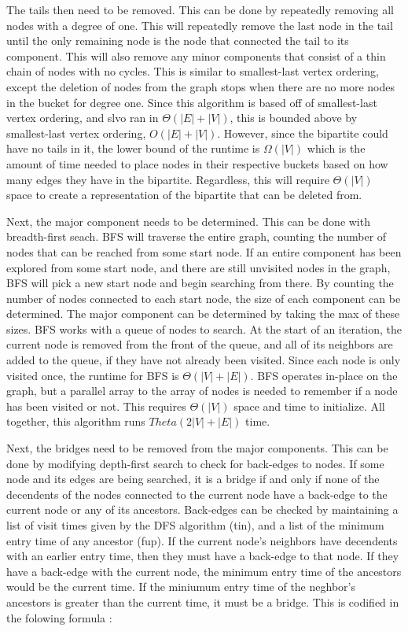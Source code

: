 \documentclass{article}
\begin{document}
        \par
        The tails then need to be removed. This can be done by repeatedly removing all nodes with a degree of one. This will repeatedly remove the last node in the tail until the only remaining node is the node that connected the tail to its component. This will also remove any minor components that consist of a thin chain of nodes with no cycles. This is similar to smallest-last vertex ordering, except the deletion of nodes from the graph stops when there are no more nodes in the bucket for degree one. Since this algorithm is based off of smallest-last vertex ordering, and slvo ran in $\Theta\left(|E| + |V|\right)$, this is bounded above by smallest-last vertex ordering, $O\left(|E| + |V|\right)$. However, since the bipartite could have no tails in it, the lower bound of the runtime is $\Omega(|V|)$ which is the amount of time needed to place nodes in their respective buckets based on how many edges they have in the bipartite. Regardless, this will require $\Theta(|V|)$ space to create a representation of the bipartite that can be deleted from.
        \par
        Next, the major component needs to be determined. This can be done with breadth-first seach. BFS will traverse the entire graph, counting the number of nodes that can be reached from some start node. If an entire component has been explored from some start node, and there are still unvisited nodes in the graph, BFS will pick a new start node and begin searching from there. By counting the number of nodes connected to each start node, the size of each component can be determined. The major component can be determined by taking the max of these sizes. BFS works with a queue of nodes to search. At the start of an iteration, the current node is removed from the front of the queue, and all of its neighbors are added to the queue, if they have not already been visited. Since each node is only visited once, the runtime for BFS is $\Theta(|V| + |E|)$. BFS operates in-place on the graph, but a parallel array to the array of nodes is needed to remember if a node has been visited or not. This requires $\Theta(|V|)$ space and time to initialize. All together, this algorithm runs $Theta(2|V| + |E|)$ time.
        \par
        Next, the bridges need to be removed from the major components. This can be done by modifying depth-first search to check for back-edges to nodes. If some node and its edges are being searched, it is a bridge if and only if none of the decendents of the nodes connected to the current node have a back-edge to the current node or any of its ancestors. Back-edges can be checked by maintaining a list of visit times given by the DFS algorithm (tin), and a list of the minimum entry time of any ancestor (fup). If the current node's neighbors have decendents with an earlier entry time, then they must have a back-edge to that node. If they have a back-edge with the current node, the minimum entry time of the ancestors would be the current time. If the miniumum entry time of the neghbor's ancestors is greater than the current time, it must be a bridge. This is codified in the folowing formula \cite{bridges}:
\end{document}
